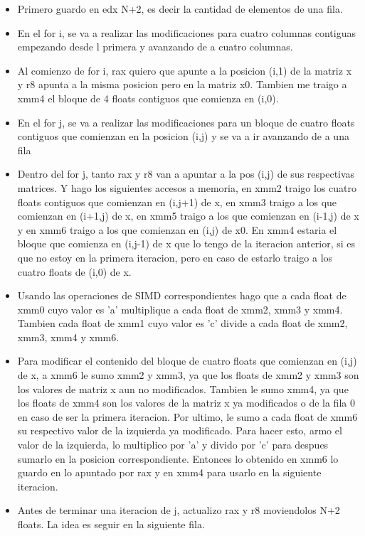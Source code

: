 \begin{itemize}
\item Primero guardo en edx N+2, es decir la cantidad de elementos de una fila.
\item En el for i, se va a realizar las modificaciones para cuatro columnas contiguas empezando desde l primera y avanzando de a cuatro columnas.
\item Al comienzo de for i, rax quiero que apunte a la posicion (i,1) de la matriz x y r8 apunta a la misma posicion pero en la matriz x0. Tambien me traigo a xmm4 el bloque de 4 floats contiguos que comienza en (i,0).
\item En el for j, se va a realizar las modificaciones para un bloque de cuatro floats contiguos que comienzan en la posicion (i,j) y se va a ir avanzando de a una fila
\item Dentro del for j, tanto rax y r8 van a apuntar a la pos (i,j) de sus respectivas matrices. Y hago los siguientes accesos a memoria, en xmm2 traigo los cuatro floats contiguos que comienzan en (i,j+1) de x, en xmm3 traigo a los que comienzan en (i+1,j) de x, en xmm5 traigo a los que comienzan en (i-1,j) de x y en xmm6 traigo a los que comienzan en (i,j) de x0. En xmm4 estaria el bloque que comienza en (i,j-1) de x  que lo tengo  de la iteracion anterior, si es que no estoy en la primera iteracion, pero en caso de estarlo traigo a los cuatro floats de (i,0) de x.
\item Usando las operaciones de SIMD correspondientes hago que a cada float de xmm0 cuyo valor es 'a' multiplique a cada float de xmm2, xmm3 y xmm4. Tambien  cada float de xmm1 cuyo valor es 'c' divide a cada float de xmm2, xmm3, xmm4 y xmm6.
\item Para modificar el contenido del bloque de cuatro floats que comienzan en (i,j) de x, a xmm6 le sumo xmm2 y xmm3, ya que los floats de xmm2 y xmm3 son los valores de matriz x aun no modificados. Tambien le sumo xmm4, ya que los floats de xmm4 son los valores de la matriz x ya modificados o de la fila 0 en caso de ser la primera iteracion. Por ultimo, le sumo a cada float de xmm6 su respectivo valor de la izquierda ya modificado. Para hacer esto, armo el valor de la izquierda, lo multiplico por 'a' y divido por 'c' para despues sumarlo en la posicion correspondiente. Entonces lo obtenido en xmm6 lo guardo en lo apuntado por rax y en xmm4 para usarlo en la siguiente iteracion. 
\item Antes de terminar una iteracion de j, actualizo rax y r8 moviendolos N+2 floats. La idea es seguir en la siguiente fila. 

\end{itemize}
